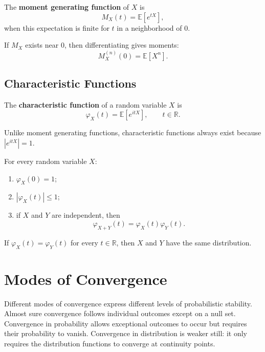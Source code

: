 \begin{definition}
The \textbf{moment generating function} of $X$ is
\[
    M_X(t)=\mathbb{E}[e^{tX}],
\]
when this expectation is finite for $t$ in a neighborhood of $0$.
\end{definition}

\begin{remark}
If $M_X$ exists near $0$, then differentiating gives moments:
\[
    M_X^{(n)}(0)=\mathbb{E}[X^n].
\]
\end{remark}

\subsection{Characteristic Functions}

\begin{definition}
The \textbf{characteristic function} of a random variable $X$ is
\[
    \varphi_X(t)=\mathbb{E}[e^{itX}],
    \qquad t\in\mathbb{R}.
\]
\end{definition}

Unlike moment generating functions, characteristic functions always exist because $|e^{itX}|=1$.

\begin{proposition}
For every random variable $X$:
\begin{enumerate}
    \item $\varphi_X(0)=1$;
    \item $|\varphi_X(t)|\leq 1$;
    \item if $X$ and $Y$ are independent, then
    \[
        \varphi_{X+Y}(t)=\varphi_X(t)\varphi_Y(t).
    \]
\end{enumerate}
\end{proposition}

\begin{theorem}
If $\varphi_X(t)=\varphi_Y(t)$ for every $t\in\mathbb{R}$, then $X$ and $Y$ have the same distribution.
\end{theorem}

\section{Modes of Convergence}


Different modes of convergence express different levels of probabilistic stability. Almost sure convergence follows individual outcomes except on a null set. Convergence in probability allows exceptional outcomes to occur but requires their probability to vanish. Convergence in distribution is weaker still: it only requires the distribution functions to converge at continuity points.


